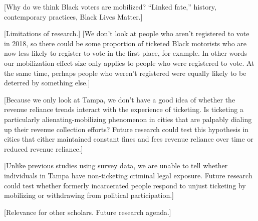 \documentclass[
  12pt,
]{article}
\begin{document}
{[}Why do we think Black voters are mobilized? ``Linked fate,'' history, contemporary practices, Black Lives Matter.{]}

{[}Limitations of research.{]} {[}We don't look at people who aren't registered to vote in 2018, so there could be some proportion of ticketed Black motorists who are now less likely to register to vote in the first place, for example. In other words our mobilization effect size only applies to people who were registered to vote. At the same time, perhaps people who weren't registered were equally likely to be deterred by something else.{]}

{[}Because we only look at Tampa, we don't have a good idea of whether the revenue reliance trends interact with the experience of ticketing. Is ticketing a particularly alienating-mobilizing phenomenon in cities that are palpably dialing up their revenue collection efforts? Future research could test this hypothesis in cities that either maintained constant fines and fees revenue reliance over time or reduced revenue reliance.{]}

{[}Unlike previous studies using survey data, we are unable to tell whether individuals in Tampa have non-ticketing criminal legal exposure. Future research could test whether formerly incarcerated people respond to unjust ticketing by mobilizing or withdrawing from political participation.{]}

{[}Relevance for other scholars. Future research agenda.{]}
\end{document}
